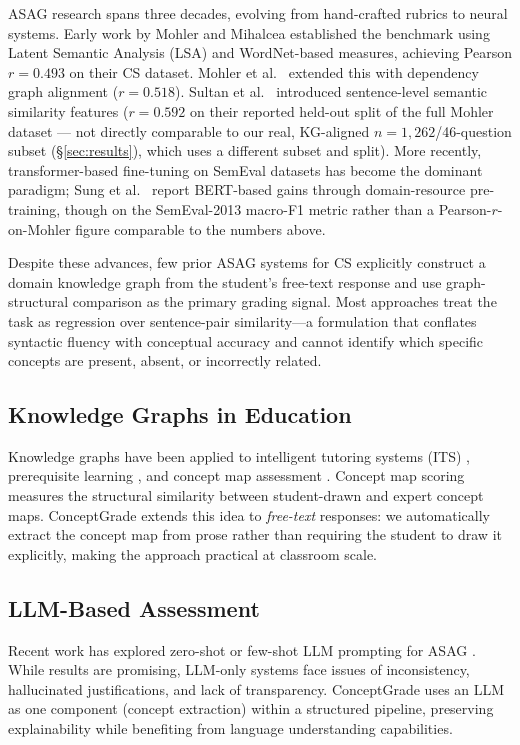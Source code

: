 \documentclass[conference]{IEEEtran}
\begin{document}
ASAG research spans three decades, evolving from hand-crafted rubrics to neural
systems. Early work by Mohler and Mihalcea \cite{mohler2009} established the
benchmark using Latent Semantic Analysis (LSA) and WordNet-based measures,
achieving Pearson \(r = 0.493\) on their CS dataset. Mohler et al.\
\cite{mohler2011} extended this with dependency graph alignment (\(r = 0.518\)).
Sultan et al.\ \cite{sultan2016} introduced sentence-level semantic similarity
features (\(r = 0.592\) on their reported held-out split of the full Mohler
dataset --- not directly comparable to our real, KG-aligned $n=1{,}262$/46-question
subset (\S\ref{sec:results}), which uses a different subset and split).
More recently, transformer-based
fine-tuning on SemEval datasets \cite{dzikovska2013} has become the dominant
paradigm; Sung et al.\ \cite{bert_asag} report BERT-based gains through
domain-resource pre-training, though on the SemEval-2013 macro-F1 metric
rather than a Pearson-$r$-on-Mohler figure comparable to the numbers above.

Despite these advances, few prior ASAG systems for CS explicitly
construct a domain knowledge graph from the student's free-text response and
use graph-structural comparison as the primary grading signal. Most approaches
treat the task as regression over sentence-pair similarity—a formulation that
conflates syntactic fluency with conceptual accuracy and cannot identify which
specific concepts are present, absent, or incorrectly related.

\subsection{Knowledge Graphs in Education}

Knowledge graphs have been applied to intelligent tutoring systems (ITS)
\cite{kg_its}, prerequisite learning \cite{kg_prereq}, and concept map assessment
\cite{concept_map}. Concept map scoring measures the structural similarity between
student-drawn and expert concept maps. ConceptGrade extends this idea to
\emph{free-text} responses: we automatically extract the concept map from prose
rather than requiring the student to draw it explicitly, making the approach
practical at classroom scale.

\subsection{LLM-Based Assessment}

Recent work has explored zero-shot or few-shot LLM prompting for ASAG
\cite{llm_asag1,llm_asag2}. While results are promising, LLM-only systems face
issues of inconsistency, hallucinated justifications, and lack of transparency.
ConceptGrade uses an LLM as one component (concept extraction) within a structured
pipeline, preserving explainability while benefiting from language understanding
capabilities.
\end{document}
